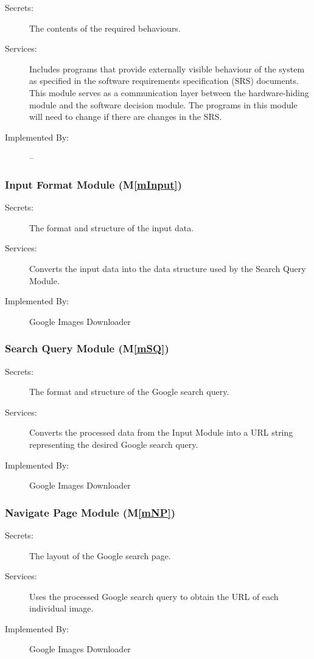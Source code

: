 \documentclass[12pt, titlepage]{article}
\newcommand{\mref}[1]{M\ref{#1}}
\begin{document}
\begin{description}
\item[Secrets:]The contents of the required behaviours.
\item[Services:]Includes programs that provide externally visible behaviour of
  the system as specified in the software requirements specification (SRS)
  documents. This module serves as a communication layer between the
  hardware-hiding module and the software decision module. The programs in this
  module will need to change if there are changes in the SRS.
\item[Implemented By:] --
\end{description}

\subsubsection{Input Format Module (\mref{mInput})}

\begin{description}
\item[Secrets:]The format and structure of the input data.
\item[Services:]Converts the input data into the data structure used by the
  Search Query Module.
\item[Implemented By:]Google Images Downloader
\end{description}

\subsubsection{Search Query Module (\mref{mSQ})}

\begin{description}
\item[Secrets:]The format and structure of the Google search query.
\item[Services:]Converts the processed data from the Input Module into a URL string representing the desired Google search query.
\item[Implemented By:]Google Images Downloader
\end{description}

\subsubsection{Navigate Page Module (\mref{mNP})}

\begin{description}
\item[Secrets:]The layout of the Google search page.
\item[Services:]Uses the processed Google search query to obtain the URL of each individual image.
\item[Implemented By:]Google Images Downloader
\end{description}
\end{document}
